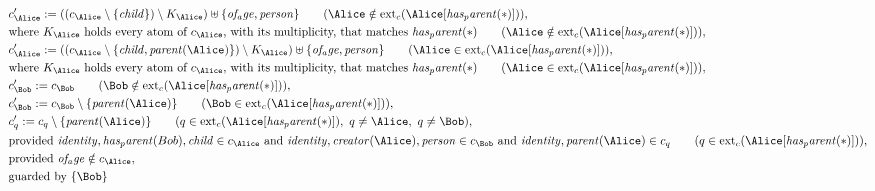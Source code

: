 \begin{align*}
&
c'_
{
\Alice
}
 := 
(
(c_
{
\Alice
}
 \setminus 
\{
\mathit{
child
}
\}
) \setminus K_
{
\Alice
}
) \uplus 
\{
\mathit{
of_age
}
,
\mathit{
person
}
\}
 \qquad (
\Alice
 \notin 
\mathrm{ext}_c(
\Alice
[
\mathit{
has_parent
}
(
\ast
)
]
)
)
,\\
&
\text{where } K_
{
\Alice
}
 \text{ holds every atom of } c_
{
\Alice
}
 \text{, with its multiplicity, that matches } 
\mathit{
has_parent
}
(
\ast
)
 \qquad (
\Alice
 \notin 
\mathrm{ext}_c(
\Alice
[
\mathit{
has_parent
}
(
\ast
)
]
)
)
,\\
&
c'_
{
\Alice
}
 := 
(
(c_
{
\Alice
}
 \setminus 
\{
\mathit{
child
}
,
\mathit{
parent
}
(
\Alice
)
\}
) \setminus K_
{
\Alice
}
) \uplus 
\{
\mathit{
of_age
}
,
\mathit{
person
}
\}
 \qquad (
\Alice
 \in 
\mathrm{ext}_c(
\Alice
[
\mathit{
has_parent
}
(
\ast
)
]
)
)
,\\
&
\text{where } K_
{
\Alice
}
 \text{ holds every atom of } c_
{
\Alice
}
 \text{, with its multiplicity, that matches } 
\mathit{
has_parent
}
(
\ast
)
 \qquad (
\Alice
 \in 
\mathrm{ext}_c(
\Alice
[
\mathit{
has_parent
}
(
\ast
)
]
)
)
,\\
&
c'_
{
\Bob
}
 := 
c_
{
\Bob
}
 \qquad (
\Bob
 \notin 
\mathrm{ext}_c(
\Alice
[
\mathit{
has_parent
}
(
\ast
)
]
)
)
,\\
&
c'_
{
\Bob
}
 := 
c_
{
\Bob
}
 \setminus 
\{
\mathit{
parent
}
(
\Alice
)
\}
 \qquad (
\Bob
 \in 
\mathrm{ext}_c(
\Alice
[
\mathit{
has_parent
}
(
\ast
)
]
)
)
,\\
&
c'_
q
 := 
c_
q
 \setminus 
\{
\mathit{
parent
}
(
\Alice
)
\}
 \qquad (
q
 \in 
\mathrm{ext}_c(
\Alice
[
\mathit{
has_parent
}
(
\ast
)
]
)
,\ 
q \neq 
\Alice
,\ 
q \neq 
\Bob
)
,\\
&
\text{provided } 
\mathit{
identity
}
,
\mathit{
has_parent
}
(
Bob
)
,
\mathit{
child
}
 \in c_
{
\Alice
}
 \text{ and } 
\mathit{
identity
}
,
\mathit{
creator
}
(
\Alice
)
,
\mathit{
person
}
 \in c_
{
\Bob
}
 \text{ and } 
\mathit{
identity
}
,
\mathit{
parent
}
(
\Alice
)
 \in c_
q
 \qquad (
q \in 
\mathrm{ext}_c(
\Alice
[
\mathit{
has_parent
}
(
\ast
)
]
)
)
,\\
&
\text{provided } 
\mathit{
of_age
}
 \notin c_
{
\Alice
}
,\\
&
\text{guarded by } \{
\Bob
\}
\end{align*}
